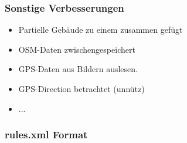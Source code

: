 \begin{frame}
  \frametitle{Sonstige Verbesserungen}
  \begin{itemize}
    \item Partielle Gebäude zu einem zusammen gefügt
    \item OSM-Daten zwischengespeichert
    \item GPS-Daten aus Bildern auslesen.
    \item GPS-Direction betrachtet (unnütz)
    \item ...
  \end{itemize}
\end{frame}

\begin{frame}
    \frametitle{rules.xml Format}
\end{frame}
